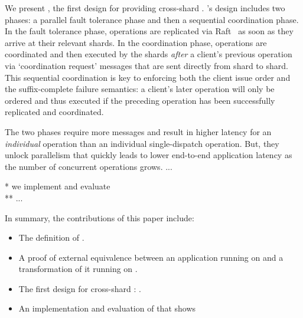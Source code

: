 We present \sys{}, the first design for providing cross-shard \mdl{}.
\sys{}'s design includes two phases: a parallel fault tolerance phase and then a sequential coordination phase.
In the fault tolerance phase, operations are replicated via Raft~\cite{raft} as soon as they arrive at their relevant shards.
In the coordination phase, operations are coordinated and then executed by the shards \textit{after} a client's previous operation via `coordination request' messages that are sent directly from shard to shard.
This sequential coordination is key to enforcing both the client issue order and the suffix-complete failure semantics:
a client's later operation will only be ordered and thus executed if the preceding operation has been successfully replicated and coordinated.

The two phases require more messages and result in higher latency for an \textit{individual} operation than an individual single-dispatch operation.
But, they unlock parallelism that quickly leads to lower end-to-end application latency as the number of concurrent operations grows.
...

%



* we implement and evaluate \sys{}\\
** ...

In summary, the contributions of this paper include:
\begin{itemize}[leftmargin=*]
\item The definition of \mdllong{}.
\item A proof of external equivalence between an application running on \sdl{} and a transformation of it running on \mdl{}.
\item The first design for cross-shard \mdl{}: \sys{}.
\item An implementation and evaluation of \sys{} that shows 
\end{itemize}
